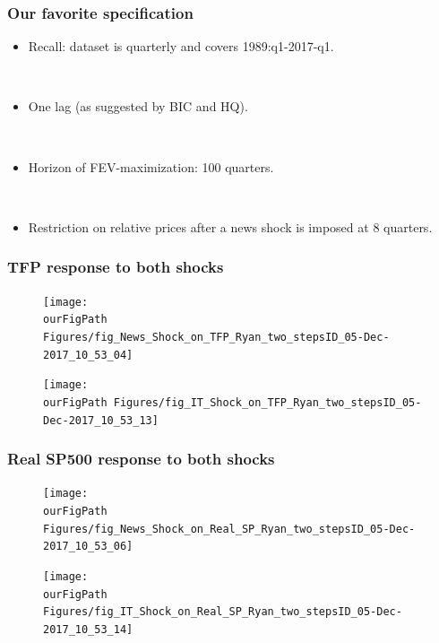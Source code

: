 \documentclass{beamer}
\def \ourFigPath {../../}
\begin{document}
\begin{frame}
	\frametitle{Our favorite specification}
	
	\begin{itemize}
	\item Recall: dataset is quarterly and covers 1989:q1-2017-q1.
	
	\
	
	\item One lag (as suggested by BIC and HQ).
	
	\
	
	\item Horizon of FEV-maximization: 100 quarters.
	
	\
	
	\item Restriction on relative prices after a news shock is imposed at 8 quarters.
	
	\end{itemize}


	
	
\end{frame}

\begin{frame}
\frametitle{TFP response to both shocks}
\begin{figure}
	\centering
	\texttt{[image: \\ourFigPath Figures/fig\_News\_Shock\_on\_TFP\_Ryan\_two\_stepsID\_05-Dec-2017\_10\_53\_04]}
\end{figure}
\begin{figure}
	\centering
	\texttt{[image: \\ourFigPath Figures/fig\_IT\_Shock\_on\_TFP\_Ryan\_two\_stepsID\_05-Dec-2017\_10\_53\_13]}
\end{figure}
\end{frame}

\begin{frame}
\frametitle{Real SP500 response to both shocks}
\begin{figure}
	\centering
	\texttt{[image: \\ourFigPath Figures/fig\_News\_Shock\_on\_Real\_SP\_Ryan\_two\_stepsID\_05-Dec-2017\_10\_53\_06]}
\end{figure}
\begin{figure}
	\centering
	\texttt{[image: \\ourFigPath Figures/fig\_IT\_Shock\_on\_Real\_SP\_Ryan\_two\_stepsID\_05-Dec-2017\_10\_53\_14]}
\end{figure}
\end{frame}
\end{document}
